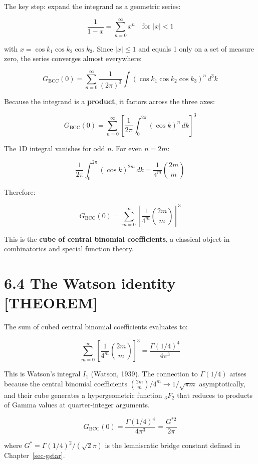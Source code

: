 \documentclass[
  11pt,
  letterpaper,
  twoside,
  openright]{book}
\begin{document}
The key step: expand the integrand as a geometric series:

\[
\frac{1}{1 - x} = \sum_{n=0}^{\infty} x^n \quad \text{for } |x| < 1
\tag{6.3}
\]

with \(x = \cos k_1 \cos k_2 \cos k_3\). Since \(|x| \leq 1\) and equals
1 only on a set of measure zero, the series converges almost everywhere:

\[
G_{\text{BCC}}(0) = \sum_{n=0}^{\infty} \frac{1}{(2\pi)^3} \int (\cos k_1 \cos k_2 \cos k_3)^n \, d^3k
\tag{6.4}
\]

Because the integrand is a \textbf{product}, it factors across the three
axes:

\[
G_{\text{BCC}}(0) = \sum_{n=0}^{\infty} \left[ \frac{1}{2\pi} \int_0^{2\pi} (\cos k)^n \, dk \right]^3
\tag{6.5}
\]

The 1D integral vanishes for odd \(n\). For even \(n = 2m\):

\[
\frac{1}{2\pi} \int_0^{2\pi} (\cos k)^{2m} \, dk = \frac{1}{4^m} \binom{2m}{m}
\tag{6.6}
\]

Therefore:

\[
G_{\text{BCC}}(0) = \sum_{m=0}^{\infty} \left[ \frac{1}{4^m} \binom{2m}{m} \right]^3
\tag{6.7}
\]

This is the \textbf{cube of central binomial coefficients}, a classical
object in combinatorics and special function theory.

\section{6.4 The Watson identity
{[}THEOREM{]}}\label{the-watson-identity-theorem}

The sum of cubed central binomial coefficients evaluates to:

\[
\sum_{m=0}^{\infty} \left[ \frac{1}{4^m} \binom{2m}{m} \right]^3 = \frac{\Gamma(1/4)^4}{4\pi^3}
\tag{6.8}
\]

This is Watson's integral \(I_1\) (Watson, 1939). The connection to
\(\Gamma(1/4)\) arises because the central binomial coefficients
\(\binom{2m}{m}/4^m \to 1/\sqrt{\pi m}\) asymptotically, and their cube
generates a hypergeometric function \({}_3F_2\) that reduces to products
of Gamma values at quarter-integer arguments.

\begin{ftdtheorem}

\[
G_{\text{BCC}}(0) = \frac{\Gamma(1/4)^4}{4\pi^3} = \frac{G^{*2}}{2\pi}
\tag{6.9}
\]

where \(G^* = \Gamma(1/4)^2 / (\sqrt{2}\pi)\) is the lemniscatic bridge
constant defined in Chapter~\ref{sec-gstar}.

\end{ftdtheorem}
\end{document}
